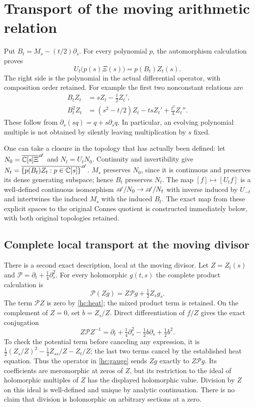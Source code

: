 \section{Transport of the moving arithmetic relation}
Put $B_t=M_s-(t/2)\partial_s$. For every polynomial $p$,
the automorphism calculation proves
\begin{equation}
U_t\bigl(p(s)\Xi(s)\bigr)=p(B_t)Z_t(s).
\label{hc:relation}
\end{equation}
The right side is the polynomial in the actual differential operator,
with composition order retained. For example the first two nonconstant
relations are
\begin{align*}
B_tZ_t&=sZ_t-\tfrac t2Z_t',\\
B_t^2Z_t&=(s^2-t/2)Z_t-tsZ_t'+\tfrac{t^2}4Z_t''.
\end{align*}
These follow from $\partial_s(sq)=q+s\partial_s q$.
In particular, an evolving polynomial multiple is not obtained by
silently leaving multiplication by $s$ fixed.

One can take a closure in the topology that has actually been defined:
let $N_0=\overline{\mathbb C[s]\Xi}^{\mathscr A}$ and $N_t=U_tN_0$.
Continuity and invertibility give
$N_t=\overline{\{p(B_t)Z_t:p\in\mathbb C[s]\}}^{\mathscr A}$.
$M_s$ preserves $N_0$, since it is continuous and preserves its dense
generating subspace; hence $B_t$ preserves $N_t$.
The map $[f]\mapsto[U_tf]$ is a well-defined continuous isomorphism
$\mathscr A/N_0\to\mathscr A/N_t$ with inverse induced by $U_{-t}$ and intertwines
the induced $M_s$ with the induced $B_t$.
The exact map from these explicit spaces to the original Connes quotient
is constructed immediately below, with both original topologies retained.


\subsection{Complete local transport at the moving divisor}
There is a second exact description, local at the moving divisor.
Let $Z=Z_t(s)$ and $\mathcal P=\partial_t+\tfrac14\partial_s^2$.
For every holomorphic $g(t,s)$ the complete product calculation is
\begin{equation}
\mathcal P(Zg)=Z\mathcal Pg+\tfrac12Z_sg_s. \label{hc:ideal-defect}
\end{equation}
The term $\mathcal PZ$ is zero by \eqref{hc:heat}; the mixed product
term is retained. On the complement of $Z=0$, set $b=Z_s/Z$.
Direct differentiation of $f/Z$ gives the exact conjugation
\begin{equation}
Z\mathcal P Z^{-1}
=\partial_t+\tfrac14\partial_s^2-\tfrac12 b\partial_s+\tfrac12 b^2.
\label{hc:gauge}
\end{equation}
To check the potential term before canceling any expression, it is
$\tfrac12(Z_s/Z)^2-\tfrac14Z_{ss}/Z-Z_t/Z$;
the last two terms cancel by the established heat equation.
Thus the operator in \eqref{hc:gauge} sends $Zg$ exactly to
$Z\mathcal Pg$. Its coefficients are meromorphic at zeros of $Z$,
but its restriction to the ideal of holomorphic multiples of $Z$
has the displayed holomorphic value. Division by $Z$ on this ideal
is well-defined and unique by analytic continuation. There is no
claim that division is holomorphic on arbitrary sections at a zero.


